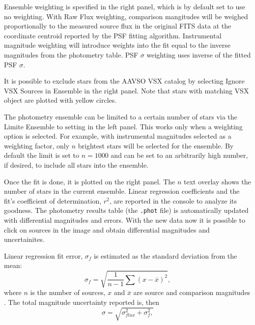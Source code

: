 \documentclass{article}
\begin{document}
Ensemble weighting is specified in the right panel, which is by default set to use no weighting. With Raw Flux weighting, comparison mangitudes will be weighed proportionally to the measured source flux in the original FITS data at the coordinate centroid reported by the PSF fitting algorithm. Instrumental magnitude weighting will introduce weights into the fit equal to the inverse magnitudes from the photometry table. PSF $\sigma$ weighting uses inverse of the fitted PSF $\sigma$. 

It is possible to exclude stars from the AAVSO VSX catalog by selecting Ignore VSX Sources in Ensemble in the right panel. Note that stars with matching VSX object are plotted with yellow circles. 

The photometry ensemble can be limited to a certain number of stars via the Limite Ensemble to setting in the left panel. This works only when a weighting option is selected. For example, with instrumental magnitudes selected as a weighting factor, only $n$ brightest stars will be selected for the ensemble. By default the limit is set to $n=1000$ and can be set to an arbitrarily high number, if desired, to include all stars into the ensemble. 

Once the fit is done, it is plotted on the right panel. The $n$ text overlay shows the number of stars in the current ensemble. Linear regression coefficients and the fit's coefficient of determination, $r^2$, are reported in the console to analyze its goodness. The photometry results table (the \texttt{.phot} file) is automatically updated with differential magnitudes and errors. With the new data now it is possible to click on sources in the image and obtain differential magnitudes and uncertainites. 



Linear regression fit error, $\sigma_{f}$ is estimated as the standard deviation from the mean:
\begin{equation}
\sigma_{f}=\sqrt{\frac{1}{n-1}\sum (x-\overline{x})^2},
\end{equation}
where $n$ is the number of sources, $x$ and $\overline{x}$ are source and comparison magnitudes \citep{1992PASP..104..435H, 2005SASS...24..107K}. The total magnitude uncertainty reported is, then
\begin{equation}
\sigma = \sqrt{\sigma_{flux}^2 + \sigma_{f}^2,}
\end{equation}
\end{document}
